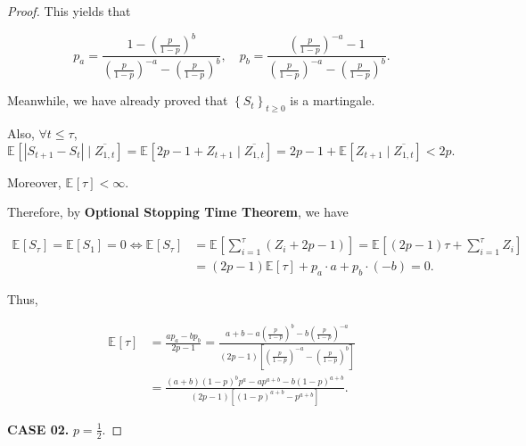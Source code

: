 \documentclass{article}
\newcommand{\set}[1]{\left\{#1\right\}}
\newcommand{\staExp}[2]{\mathbb{E}_{#1}\left[#2\right]}
\begin{document}
\begin{proof}
    \hspace{1.3em}
    This yields that
    
    \vspace{-1.5em} 
    $$p_a = \frac{1-\left(\frac{p}{1-p}\right)^b}{\left(\frac{p}{1-p}\right)^{-a}-\left(\frac{p}{1-p}\right)^b},\quad p_b = \frac{\left(\frac{p}{1-p}\right)^{-a}-1}{\left(\frac{p}{1-p}\right)^{-a}-\left(\frac{p}{1-p}\right)^b}.$$
    
    \vspace{1em} \hspace{1.3em}
    Meanwhile, we have already proved that $\set{S_t}_{t\geq0}$ is a martingale.
    
    \hspace{1.3em}
    Also, $\forall t\le\tau$, $\staExp{}{|S_{t+1}-S_t|\mid\overline{Z_{1,t}}}=\staExp{}{2p-1+Z_{t+1}\mid \overline{Z_{1,t}}} = 2p-1+\staExp{}{Z_{t+1}\mid\overline{Z_{1,t}}} < 2p. $
    
    \hspace{1.3em} 
    Moreover, $\staExp{}{\tau}<\infty$. 
    
    \hspace{1.3em}
    Therefore, by \textbf{Optional Stopping Time Theorem}, we have 
    
    \vspace{-2em}
    \begin{align*}
    \staExp{}{S_\tau}=\staExp{}{S_1}=0 \Longleftrightarrow \staExp{}{S_\tau}&=\staExp{}{\sum_{i=1}^{\tau}(Z_i+2p-1)}=\staExp{}{(2p-1)\tau+\sum_{i=1}^{\tau}Z_i} \\
    &= (2p-1)\staExp{}{\tau} + p_a\cdot a + p_b \cdot (-b) = 0.
    \end{align*}
    
    \vspace{-1.2em} \hspace{1.3em}
    Thus,
    
    \vspace{-3.3em}
    \begin{align*}
        \staExp{}{\tau} &= \frac{ap_a-bp_b}{2p-1} = 
    \frac{a+b-a\left(\frac{p}{1-p}\right)^b-b\left(\frac{p}{1-p}\right)^{-a}}{(2p-1)\left[\left(\frac{p}{1-p}\right)^{-a}-\left(\frac{p}{1-p}\right)^b\right]} \\
    &=\frac{(a+b)(1-p)^bp^a-ap^{a+b}-b(1-p)^{a+b}}{(2p-1)[(1-p)^{a+b}-p^{a+b}]}.
    \end{align*}
    
    \vspace{1em} \hspace{1.3em}
    \textbf{CASE 02.} $p=\frac{1}{2}.$
    

\end{proof}
\end{document}
